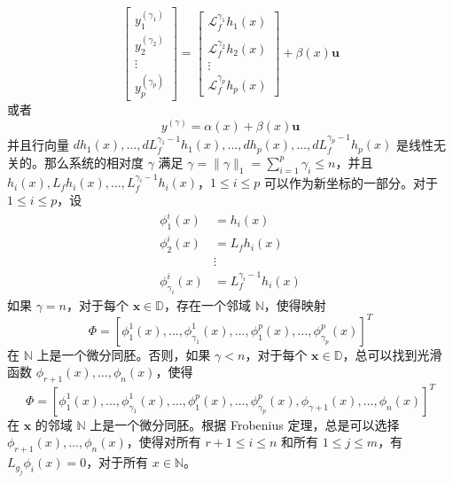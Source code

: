 \begin{ubox}
\begin{equation}
	\left.\left[\begin{array}{c}y_1^{(\gamma_1)}\\y_2^{(\gamma_2)}\\\vdots\\y_p^{(\gamma_p)}\end{array}\right.\right]=\left[\begin{array}{cccc}\mathcal{L}_f^{\gamma_1}h_1(x)\\\\\mathcal{L}_f^{\gamma_2}h_2(x)\\\vdots\\\mathcal{L}_f^{\gamma_p}h_p(x)\end{array}\right] +  \beta(x)  \boldsymbol{u}
  \end{equation}
  或者
  \begin{equation}
	y^{(\gamma)}=\alpha(x) + \beta(x) \boldsymbol{u}
	\label{outputdynamic}
  \end{equation}
  并且行向量 $dh_{1}(x),\ldots,dL_{f}^{\gamma_{1}-1}h_{1}(x),\ldots,dh_{p}(x),\ldots,dL_{f}^{\gamma_{p}-1}h_{p}(x)$ 是线性无关的。那么系统的相对度 $\gamma$ 满足 $\gamma=\|\gamma\|_{1}=\sum_{i=1}^{p}\gamma_{i}\leq n$，并且 $h_i(x),L_{f}h_i(x),\ldots,L_{f}^{\gamma_{i}-1}h_i(x)$，$1\leq i\leq p$ 可以作为新坐标的一部分。对于 $1\leq i\leq p$，设 
  \begin{equation}
	\begin{aligned}
	  \phi_{1}^{i}(x)&= h_{i}(x)\\
	  \phi_{2}^{i}(x)&= L_{f}h_{i}(x)\\
	  &\vdots\\
	  \phi_{\gamma_{i}}^{i}(x)&= L_{f}^{\gamma_{i}-1}h_{i}(x) 
	\end{aligned}
  \end{equation}
  如果 $\gamma  = n$，对于每个 $\bm{x} \in  \mathbb{D}$，存在一个邻域 $\mathbb{N}$，使得映射 
  \begin{equation}
  \Phi=[\phi_{1}^{1}(x),\ldots,\phi_{\gamma_1}^{1}(x),\ldots,\phi_{1}^{p}(x),\ldots,\phi_{\gamma_{p}}^{p}(x)]^{T}
  \end{equation}
  在 $\mathbb{N}$ 上是一个微分同胚。否则，如果 $\gamma < n$，对于每个 $\bm{x} \in  \mathbb{D}$，总可以找到光滑函数 $\phi_{r+1}(x),\ldots,\phi_{n}(x)$，使得
  \begin{equation}
	\Phi=[\phi_{1}^{1}(x),\ldots,\phi_{\gamma_1}^{1}(x),\ldots,\phi_{1}^{p}(x),\ldots,\phi_{\gamma_{p}}^{p}(x),\phi_{\gamma+1}(x),\ldots,\phi_{n}(x)]^{T}
  \end{equation}
  在 $\bm{x}$ 的邻域 $\mathbb{N}$ 上是一个微分同胚。根据 Frobenius 定理，总是可以选择 $\phi_{r+1}(x),\ldots,\phi_{n}(x)$，使得对所有 $r+1\leq i\leq n$ 和所有 $1\leq j\leq m$，有 $L_{g_{j}}\phi_{i}(x)=0$，对于所有 $x \in \mathbb{N}$。 
  

\end{ubox}
